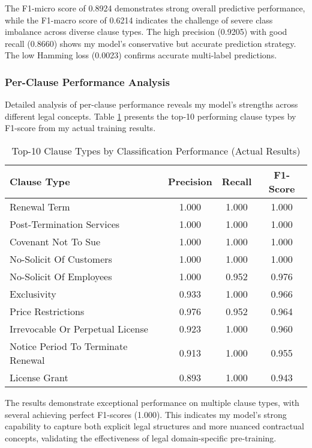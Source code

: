 The F1-micro score of 0.8924 demonstrates strong overall predictive performance, while the F1-macro score of 0.6214 indicates the challenge of severe class imbalance across diverse clause types. The high precision (0.9205) with good recall (0.8660) shows my model's conservative but accurate prediction strategy. The low Hamming loss (0.0023) confirms accurate multi-label predictions.

\subsubsection{Per-Clause Performance Analysis}
Detailed analysis of per-clause performance reveals my model's strengths across different legal concepts. Table \ref{tab:top_clauses} presents the top-10 performing clause types by F1-score from my actual training results.

\begin{table}[ht]
\centering
\caption{Top-10 Clause Types by Classification Performance (Actual Results)}
\label{tab:top_clauses}
\begin{tabular}{|l|c|c|c|}
\hline
\textbf{Clause Type} & \textbf{Precision} & \textbf{Recall} & \textbf{F1-Score} \\
\hline
Renewal Term & 1.000 & 1.000 & 1.000 \\
Post-Termination Services & 1.000 & 1.000 & 1.000 \\
Covenant Not To Sue & 1.000 & 1.000 & 1.000 \\
No-Solicit Of Customers & 1.000 & 1.000 & 1.000 \\
No-Solicit Of Employees & 1.000 & 0.952 & 0.976 \\
Exclusivity & 0.933 & 1.000 & 0.966 \\
Price Restrictions & 0.976 & 0.952 & 0.964 \\
Irrevocable Or Perpetual License & 0.923 & 1.000 & 0.960 \\
Notice Period To Terminate Renewal & 0.913 & 1.000 & 0.955 \\
License Grant & 0.893 & 1.000 & 0.943 \\
\hline
\end{tabular}
\end{table}

The results demonstrate exceptional performance on multiple clause types, with several achieving perfect F1-scores (1.000). This indicates my model's strong capability to capture both explicit legal structures and more nuanced contractual concepts, validating the effectiveness of legal domain-specific pre-training.

